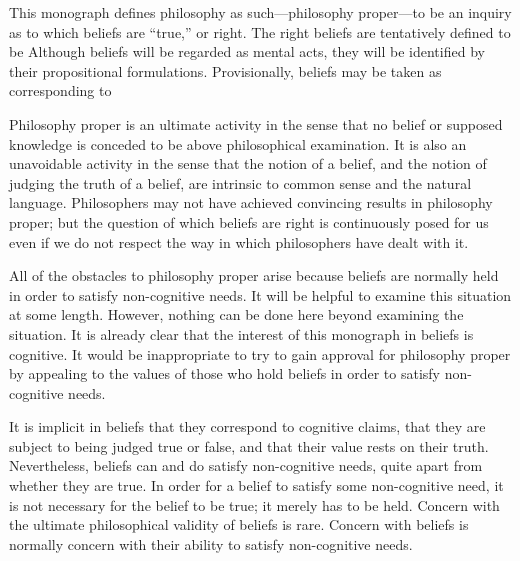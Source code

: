 












This monograph defines philosophy as such---philosophy proper---to be an inquiry as to which beliefs are \enquote{true,} or right. The right beliefs are tentatively defined to be Although beliefs will be regarded as mental acts, they will be identified by their propositional formulations. Provisionally, beliefs may be taken as corresponding to 

Philosophy proper is an ultimate activity in the sense that no belief or supposed knowledge is conceded to be above philosophical examination. It is also an unavoidable activity in the sense that the notion of a belief, and the notion of judging the truth of a belief, are intrinsic to common sense and the natural language. Philosophers may not have achieved convincing results in philosophy proper; but the question of which beliefs are right is continuously posed for us even if we do not respect the way in which philosophers have dealt with it. 

All of the obstacles to philosophy proper arise because beliefs are normally held in order to satisfy non-cognitive needs. It will be helpful to examine this situation at some length. However, nothing can be done here beyond examining the situation. It is already clear that the interest of this monograph in beliefs is cognitive. It would be inappropriate to try to gain approval for philosophy proper by appealing to the values of those who hold beliefs in order to satisfy non-cognitive needs. 

It is implicit in beliefs that they correspond to cognitive claims, that they are subject to being judged true or false, and that their value rests on their truth. Nevertheless, beliefs can and do satisfy non-cognitive needs, quite apart from whether they are true. In order for a belief to satisfy some non-cognitive need, it is not necessary for the belief to be true; it merely has to be held. Concern with the ultimate philosophical validity of beliefs is rare. Concern with beliefs is normally concern with their ability to satisfy non-cognitive needs. 

